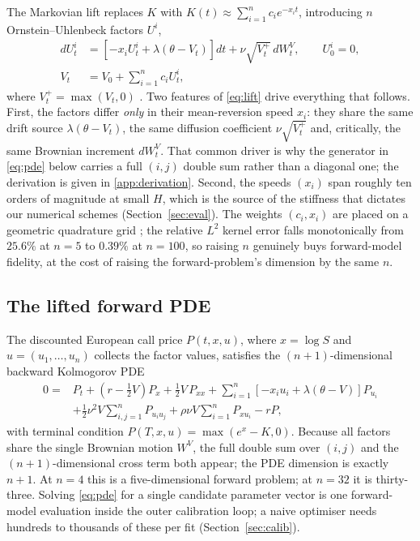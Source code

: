\documentclass[preprint,12pt]{elsarticle}
\begin{document}
The Markovian lift replaces $K$ with
$K(t)\approx\sum_{i=1}^{n}c_i e^{-x_i t}$, introducing $n$
Ornstein--Uhlenbeck factors $U^i$,
\begin{equation}
  \begin{split}
  dU^i_t &= \left[-x_i U^i_t + \lambda\left(\theta - V_t\right)\right]dt
           + \nu\sqrt{V^+_t}\,dW^V_t, \qquad U^i_0 = 0,\\
  V_t &= V_0 + \sum_{i=1}^{n} c_i U^i_t,
  \end{split}
  \label{eq:lift}
\end{equation}
where $V^+_t=\max(V_t,0)$
\citep{abijaber2019multifactor,abijaber2019lifting}. Two features of
\eqref{eq:lift} drive everything that follows. First, the factors differ
\emph{only} in their mean-reversion speed $x_i$: they share the same drift
source $\lambda(\theta-V_t)$, the same diffusion coefficient $\nu\sqrt{V^+_t}$
and, critically, the same Brownian increment $dW^V_t$. That common driver is why
the generator in \eqref{eq:pde} below carries a full $(i,j)$ double sum rather
than a diagonal one; the derivation is given in \ref{app:derivation}. Second, the
speeds $(x_i)$ span roughly ten orders of magnitude at small $H$, which is the
source of the stiffness that dictates our numerical schemes
(Section~\ref{sec:eval}). The weights $(c_i,x_i)$ are
placed on a geometric quadrature grid \citep{abijaber2019multifactor}; the
relative $L^2$ kernel error falls monotonically from $25.6\%$ at $n{=}5$ to
$0.39\%$ at $n{=}100$, so raising $n$ genuinely buys forward-model fidelity, at
the cost of raising the forward-problem's dimension by the same $n$.

\subsection{The lifted forward PDE}
The discounted European call price $P(t,x,u)$, where $x=\log S$ and
$u=(u_1,\ldots,u_n)$ collects the factor values, satisfies the
$(n{+}1)$-dimensional backward Kolmogorov PDE
\begin{align}
  0 = {}& P_t + \!\left(r-\tfrac12 V\right)P_x + \tfrac12 V\,P_{xx}
         + \sum_{i=1}^{n}\!\left[-x_i u_i + \lambda(\theta-V)\right]P_{u_i}
         \nonumber\\
        & + \tfrac12\nu^2 V\sum_{i,j=1}^{n}P_{u_i u_j}
         + \rho\nu V\sum_{i=1}^{n} P_{x u_i} - rP ,
  \label{eq:pde}
\end{align}
with terminal condition $P(T,x,u)=\max(e^x - K, 0)$. Because all factors share
the single Brownian motion $W^V$, the full double sum over $(i,j)$ and the
$(n{+}1)$-dimensional cross term both appear; the PDE dimension is exactly
$n{+}1$. At $n{=}4$ this is a five-dimensional forward problem; at $n{=}32$ it is
thirty-three. Solving \eqref{eq:pde} for a single candidate parameter vector is
one forward-model evaluation inside the outer calibration loop; a naive
optimiser needs hundreds to thousands of these per fit (Section~\ref{sec:calib}).
\end{document}
